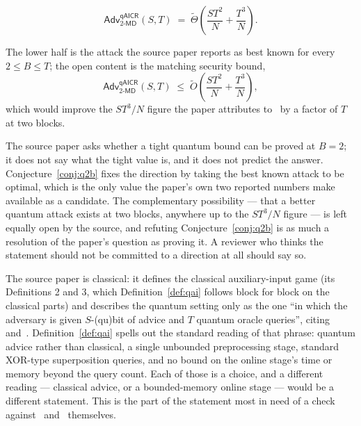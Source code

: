 \documentclass{aicr-conjecture}
\newcommand{\MD}{\mathsf{MD}}
\newcommand{\Adv}{\mathsf{Adv}}
\newcommand{\qaicr}{\mathsf{qAICR}}
\newcommand{\tO}{\tilde{O}}
\newcommand{\tTh}{\tilde{\Theta}}
\begin{document}
\begin{conjecture}\label{conj:q2b}
\[
  \Adv^{\qaicr}_{2\text{-}\MD}(S,T)
  \;=\; \tTh\!\left(\frac{ST^{2}}{N} + \frac{T^{3}}{N}\right).
\]
\end{conjecture}

The lower half is the attack the source paper reports as best known for
every $2 \le B \le T$; the open content is the matching security bound,
\[
  \Adv^{\qaicr}_{2\text{-}\MD}(S,T)
  \;\le\; \tO\!\left(\frac{ST^{2}}{N} + \frac{T^{3}}{N}\right),
\]
which would improve the $ST^{3}/N$ figure the paper attributes
to~\cite{GLLZ21} by a factor of $T$ at two blocks.

\begin{remark}\label{rem:direction}
The source paper asks whether a tight quantum bound can be proved at
$B = 2$; it does not say what the tight value is, and it does not
predict the answer. Conjecture~\ref{conj:q2b} fixes the direction by
taking the best known attack to be optimal, which is the only value
the paper's own two reported numbers make available as a candidate.
The complementary possibility --- that a better quantum attack exists
at two blocks, anywhere up to the $ST^{3}/N$ figure --- is left equally
open by the source, and refuting Conjecture~\ref{conj:q2b} is as much a
resolution of the paper's question as proving it. A reviewer who thinks
the statement should not be committed to a direction at all should say
so.
\end{remark}

\begin{remark}\label{rem:model}
The source paper is classical: it defines the classical auxiliary-input
game (its Definitions 2 and 3, which Definition~\ref{def:qai} follows
block for block on the classical parts) and describes the quantum
setting only as the one ``in which the adversary is given $S$-(qu)bit
of advice and $T$ quantum oracle queries'', citing~\cite{CGLQ20}
and~\cite{GLLZ21}. Definition~\ref{def:qai} spells out the standard
reading of that phrase: quantum advice rather than classical, a single
unbounded preprocessing stage, standard XOR-type superposition queries,
and no bound on the online stage's time or memory beyond the query
count. Each of those is a choice, and a different reading --- classical
advice, or a bounded-memory online stage --- would be a different
statement. This is the part of the statement most in need of a check
against~\cite{CGLQ20} and~\cite{GLLZ21} themselves.
\end{remark}
\end{document}
